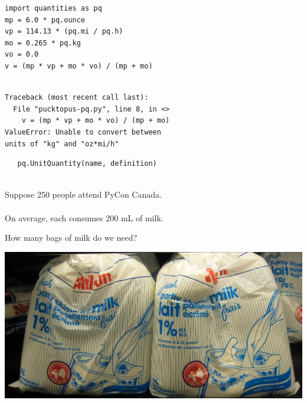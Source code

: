 \documentclass[17pt]{beamer}
\begin{document}
\begin{frame}[fragile]
  \vspace{-22.5pt}
  \begin{verbatim}
import quantities as pq
mp = 6.0 * pq.ounce
vp = 114.13 * (pq.mi / pq.h)
mo = 0.265 * pq.kg
vo = 0.0
v = (mp * vp + mo * vo) / (mp + mo)


  \end{verbatim}
\end{frame}

\begin{frame}[fragile]
  \vspace{-22pt}
  \begin{verbatim}
Traceback (most recent call last):
  File "pucktopus-pq.py", line 8, in <>
    v = (mp * vp + mo * vo) / (mp + mo)
ValueError: Unable to convert between
units of "kg" and "oz*mi/h"
  \end{verbatim}
\end{frame}

\begin{frame}[fragile]
  \vspace{-12pt}
  \begin{center}
    \begin{verbatim}
   pq.UnitQuantity(name, definition)


    \end{verbatim}
    \pause

    \begin{small}
      Suppose 250 people attend PyCon Canada. \\ ~ \\
      On average, each consumes 200 mL of milk.
    \end{small}
  \end{center}
\end{frame}

\begin{frame}
  \vspace{-4pt}
  How many bags of milk do we need? \vspace{1em}
  
  \hspace*{-.055\columnwidth}
  \includegraphics[width=1.1\columnwidth]{milkbags}
\end{frame}
\end{document}
